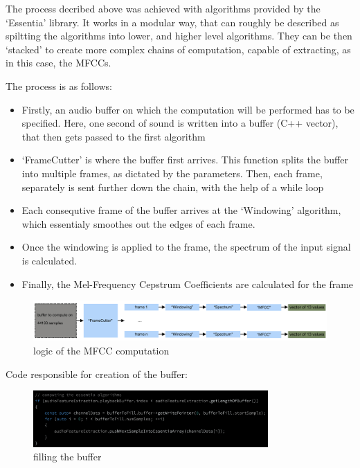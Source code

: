 The process decribed above was achieved with algorithms provided by
the `Essentia' library\cite{noauthor_homepage_nodate}. It works in a
modular way, that can roughly be described as spiltting the algorithms
into lower, and higher level algorithms. They can be then `stacked' to
create more complex chains of computation, capable of extracting, as
in this case, the MFCCs.

The process is as follows:

\begin{itemize}
\item Firstly, an audio buffer on which the computation will be
  performed has to be specified. Here, one second of sound is written
  into a buffer (C++ vector), that then gets passed to the first algorithm
\item `FrameCutter' is where the buffer first arrives. This function
  splits the buffer into multiple frames, as dictated by the
  parameters. Then, each frame, separately is sent further down the
  chain, with the help of a while loop
\item Each consequtive frame of the buffer arrives at the `Windowing'
  algorithm, which essentialy smoothes out the edges of each frame.
\item Once the windowing is applied to the frame, the spectrum of the
  input signal is calculated.
\item Finally, the Mel-Frequency Cepstrum Coefficients are calculated
  for the frame
\end{itemize}

\begin{figure}[!h]
\caption{logic of the MFCC computation}
\centering
\includegraphics[width=1\textwidth]{images/essentia_logic}
\end{figure}

Code responsible for creation of the buffer:
\begin{figure}[!h]
\caption{filling the buffer}
\centering
\includegraphics[width=0.8\textwidth]{images/essentia_buffer}
\end{figure}

